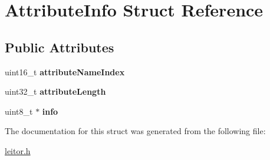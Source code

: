 \hypertarget{structAttributeInfo}{}\section{Attribute\+Info Struct Reference}
\label{structAttributeInfo}
\subsection*{Public Attributes}
\begin{DoxyCompactItemize}
\item 
\mbox{\label{structAttributeInfo_ac0d9d9ffa3214f362c4e06df78036d6e}} 
uint16\+\_\+t {\bfseries attribute\+Name\+Index}
\item 
\mbox{\label{structAttributeInfo_a1755dec7721e0e62a53c698831ba514d}} 
uint32\+\_\+t {\bfseries attribute\+Length}
\item 
\mbox{\label{structAttributeInfo_a29031abd0ae7fd3a55950616e5368dd2}} 
uint8\+\_\+t $\ast$ {\bfseries info}
\end{DoxyCompactItemize}


The documentation for this struct was generated from the following file\+:\begin{DoxyCompactItemize}
\item 
\hyperlink{leitor_8h}{leitor.\+h}\end{DoxyCompactItemize}
